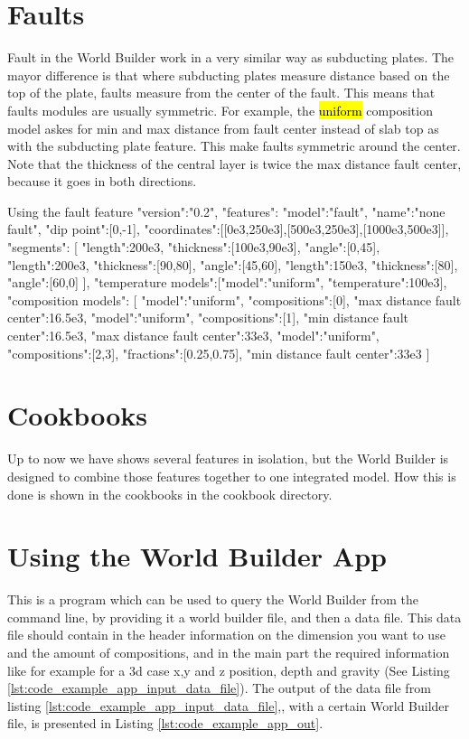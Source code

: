 \documentclass{book}
\newcommand{\WB}{{World Builder}}
\begin{document}
\section{Faults}
Fault in the \WB{} work in a very similar way as subducting plates. The mayor difference is that where subducting plates measure distance based on the top of the plate, faults measure from the center of the fault. This means that faults modules are usually symmetric. For example, the \hl{uniform} composition model askes for min and max distance from fault center instead of slab top as with the subducting plate feature. This make faults symmetric around the center. Note that the thickness of the central layer is twice the max distance fault center, because it goes in both directions.

\begin{javascriptcode}{Using the fault feature}{}
"version":"0.2",
"features":
{
  {
    "model":"fault", "name":"none fault",  "dip point":[0,-1],
    "coordinates":[[0e3,250e3],[500e3,250e3],[1000e3,500e3]],
    "segments":
    [
      {"length":200e3, "thickness":[100e3,90e3], "angle":[0,45]}, 
      {"length":200e3, "thickness":[90,80], "angle":[45,60]}, 
      {"length":150e3, "thickness":[80], "angle":[60,0]}
    ],
    "temperature models":[{"model":"uniform", "temperature":100e3}],
    "composition models":
    [
      {"model":"uniform", "compositions":[0], "max distance fault center":16.5e3},
      {"model":"uniform", "compositions":[1], "min distance fault center":16.5e3, 
        "max distance fault center":33e3},
      {"model":"uniform", "compositions":[2,3], "fractions":[0.25,0.75], 
         "min distance fault center":33e3}
    ]
  }
}
\end{javascriptcode}

\section{Cookbooks}
Up to now we have shows several features in isolation, but the \WB{} is designed to combine those features together to one integrated model. How this is done is shown in the cookbooks in the cookbook directory.

\section{Using the World Builder App}
\label{section:using_the_app}
This is a program which can be used to query the \WB{} from the command line, by providing it a world builder file, and then a data file. This data file should contain in the header information on the dimension you want to use and the amount of compositions, and in the main part the required information like for example for a 3d case x,y and z position, depth and gravity (See Listing \ref{lst:code_example_app_input_data_file}). The output of the data file from listing \ref{lst:code_example_app_input_data_file},, with a certain \WB{} file, is presented in Listing \ref{lst:code_example_app_out}.
\end{document}
